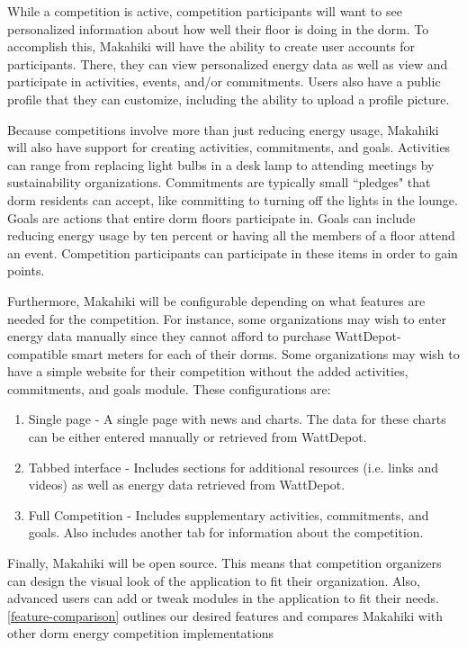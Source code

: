 While a competition is active, competition participants will want to see personalized information about how well their floor is doing in the dorm.  To accomplish this, Makahiki will have the ability to create user accounts for participants.  There, they can view personalized energy data as well as view and participate in activities, events, and/or commitments.  Users also have a public profile that they can customize, including the ability to upload a profile picture.

Because competitions involve more than just reducing energy usage, Makahiki will also have support for creating activities, commitments, and goals.  Activities can range from replacing light bulbs in a desk lamp to attending meetings by sustainability organizations.  Commitments are typically small ``pledges" that dorm residents can accept, like committing to turning off the lights in the lounge.  Goals are actions that entire dorm floors participate in.  Goals can include reducing energy usage by ten percent or having all the members of a floor attend an event.  Competition participants can participate in these items in order to gain points.

Furthermore, Makahiki will be configurable depending on what features are needed for the competition.  For instance, some organizations may wish to enter energy data manually since they cannot afford to purchase WattDepot-compatible smart meters for each of their dorms.  Some organizations may wish to have a simple website for their competition without the added activities, commitments, and goals module.  These configurations are:

\begin{enumerate}
	\item Single page - A single page with news and charts.  The data for these charts can be either entered manually or retrieved from WattDepot.
	\item Tabbed interface - Includes sections for additional resources (i.e. links and videos) as well as energy data retrieved from WattDepot.
	\item Full Competition - Includes supplementary activities, commitments, and goals.  Also includes another tab for information about the competition.
\end{enumerate}

Finally, Makahiki will be open source.  This means that competition organizers can design the visual look of the application to fit their organization.  Also, advanced users can add or tweak modules in the application to fit their needs.  \autoref{feature-comparison} outlines our desired features and compares Makahiki with other dorm energy competition implementations

